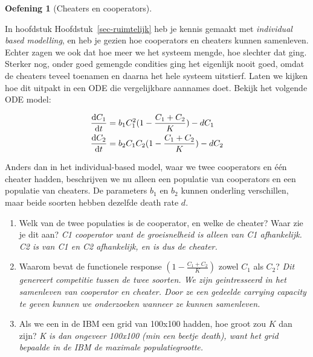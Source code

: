 \documentclass[
  a4paper,
]{scrbook}
\providecommand{\tightlist}{%
  \setlength{\itemsep}{0pt}\setlength{\parskip}{0pt}}\usepackage{longtable,booktabs,array}
\theoremstyle{definition}
\newtheorem{exercise}{Oefening}[chapter]
\theoremstyle{remark}
\begin{document}
\begin{exercise}[Cheaters en
cooperators]\protect\hypertarget{exr-cheatandcoop}{}\label{exr-cheatandcoop}

In hoofdstuk Hoofdstuk~\ref{sec-ruimtelijk} heb je kennis gemaakt met
\emph{individual based modelling}, en heb je gezien hoe cooperators en
cheaters kunnen samenleven. Echter zagen we ook dat hoe meer we het
systeem mengde, hoe slechter dat ging. Sterker nog, onder goed gemengde
condities ging het eigenlijk nooit goed, omdat de cheaters teveel
toenamen en daarna het hele systeem uitstierf. Laten we kijken hoe dit
uitpakt in een ODE die vergelijkbare aannames doet. Bekijk het volgende
ODE model:

\begin{align*}
\mathchoice{\frac{\mathrm{d}C_1}
{\mathrm{d}t}}{\mathrm{d}C_1/\mathrm{d}t}
{\mathrm{d}C_1/\mathrm{d}t}
{\mathrm{d}C_1/\mathrm{d}t} &= b_1C_1^2(1-\frac{C_1+C_2}{K}) - dC_1\\
\mathchoice{\frac{\mathrm{d}C_2}
{\mathrm{d}t}}{\mathrm{d}C_2/\mathrm{d}t}
{\mathrm{d}C_2/\mathrm{d}t}
{\mathrm{d}C_2/\mathrm{d}t} &= b_2C_1C_2(1-\frac{C_1+C_2}{K}) - dC_2
\end{align*}

Anders dan in het individual-based model, waar we twee cooperators en
één cheater hadden, beschrijven we nu alleen een populatie van
cooperators en een populatie van cheaters. De parameters \(b_1\) en
\(b_2\) kunnen onderling verschillen, maar beide soorten hebben dezelfde
death rate \(d\).

\begin{enumerate}
\def\labelenumi{\alph{enumi}.}
\tightlist
\item
  Welk van de twee populaties is de cooperator, en welke de cheater?
  Waar zie je dit aan? \emph{C1 cooperator want de groeisnelheid is
  alleen van C1 afhankelijk. C2 is van C1 en C2 afhankelijk, en is dus
  de cheater.}
\item
  Waarom bevat de functionele response \((1-\frac{C_1+C_2}{K})\) zowel
  \(C_1\) als \(C_2\)? \emph{Dit genereert competitie tussen de twee
  soorten. We zijn geintresseerd in het samenleven van cooperator en
  cheater. Door ze een gedeelde carrying capacity te geven kunnen we
  onderzoeken wanneer ze kunnen samenleven.}
\item
  Als we een in de IBM een grid van 100x100 hadden, hoe groot zou \(K\)
  dan zijn? \emph{K is dan ongeveer 100x100 (min een beetje death), want
  het grid bepaalde in de IBM de maximale populatiegrootte.}
\end{enumerate}


\end{exercise}
\end{document}

